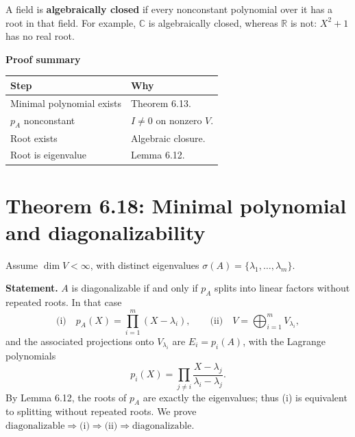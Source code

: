 \documentclass[11pt,a4paper]{article}
\newcommand{\prooftable}[1]{\medskip\textbf{Proof summary}\par\smallskip #1\medskip}
\begin{document}
\begin{personalnote}[title=Definitions for understanding]
A field is \textbf{algebraically closed} if every nonconstant polynomial
over it has a root in that field. For example, \(\mathbb C\) is algebraically
closed, whereas \(\mathbb R\) is not: \(X^2+1\) has no real root.
\end{personalnote}
\prooftable{\begin{tabularx}{\linewidth}{@{}p{.28\linewidth}X@{}}\hline
Step & Why\\\hline
Minimal polynomial exists & Theorem 6.13.\\
\(p_A\) nonconstant & \(I\neq0\) on nonzero \(V\).\\
Root exists & Algebraic closure.\\
Root is eigenvalue & Lemma 6.12.\\\hline
\end{tabularx}}

\section*{Theorem 6.18: Minimal polynomial and diagonalizability}
Assume \(\dim V<\infty\), with distinct eigenvalues
\(\sigma(A)=\{\lambda_1,\ldots,\lambda_m\}\).

\textbf{Statement.} \(A\) is diagonalizable if and only if \(p_A\)
splits into linear factors without repeated roots. In that case
\[
\text{(i)}\quad p_A(X)=\prod_{i=1}^m(X-\lambda_i),\qquad
\text{(ii)}\quad V=\bigoplus_{i=1}^m V_{\lambda_i},
\]
and the associated projections onto \(V_{\lambda_i}\) are
\(E_i=p_i(A)\), with the Lagrange polynomials
\[
p_i(X)=\prod_{j\neq i}\frac{X-\lambda_j}{\lambda_i-\lambda_j}.
\]
By Lemma 6.12, the roots of \(p_A\) are exactly the eigenvalues;
thus (i) is equivalent to splitting without repeated roots.
We prove \(\text{diagonalizable}\Rightarrow\text{(i)}
\Rightarrow\text{(ii)}\Rightarrow\text{diagonalizable}\).
\end{document}
